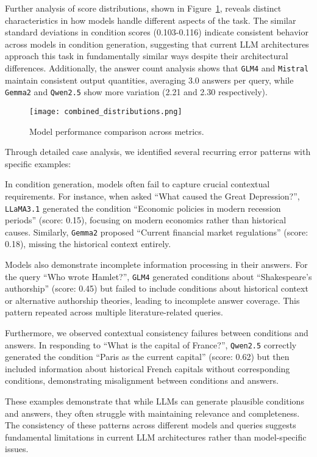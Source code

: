 Further analysis of score distributions, shown in Figure~\ref{fig:score-distributions}, reveals distinct characteristics in how models handle different aspects of the task. The similar standard deviations in condition scores (0.103-0.116) indicate consistent behavior across models in condition generation, suggesting that current LLM architectures approach this task in fundamentally similar ways despite their architectural differences. Additionally, the answer count analysis shows that \texttt{GLM4} and \texttt{Mistral} maintain consistent output quantities, averaging 3.0 answers per query, while \texttt{Gemma2} and \texttt{Qwen2.5} show more variation (2.21 and 2.30 respectively).

\begin{figure}[h]
\centering
\texttt{[image: combined\_distributions.png]}
\caption{Model performance comparison across metrics.}
\label{fig:score-distributions}
\end{figure}

Through detailed case analysis, we identified several recurring error patterns with specific examples:

In condition generation, models often fail to capture crucial contextual requirements. For instance, when asked ``What caused the Great Depression?'', \texttt{LLaMA3.1} generated the condition ``Economic policies in modern recession periods'' (score: 0.15), focusing on modern economics rather than historical causes. Similarly, \texttt{Gemma2} proposed ``Current financial market regulations'' (score: 0.18), missing the historical context entirely.

Models also demonstrate incomplete information processing in their answers. For the query ``Who wrote Hamlet?'', \texttt{GLM4} generated conditions about ``Shakespeare's authorship'' (score: 0.45) but failed to include conditions about historical context or alternative authorship theories, leading to incomplete answer coverage. This pattern repeated across multiple literature-related queries.

Furthermore, we observed contextual consistency failures between conditions and answers. In responding to ``What is the capital of France?'', \texttt{Qwen2.5} correctly generated the condition ``Paris as the current capital'' (score: 0.62) but then included information about historical French capitals without corresponding conditions, demonstrating misalignment between conditions and answers.

These examples demonstrate that while LLMs can generate plausible conditions and answers, they often struggle with maintaining relevance and completeness. The consistency of these patterns across different models and queries suggests fundamental limitations in current LLM architectures rather than model-specific issues.

